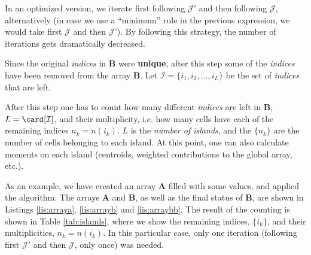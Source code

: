 \begin{enumerate}
  In an optimized version, we iterate first following $\mathcal{J}'$
  and then following $\mathcal{J}$, alternatively (in case we use a
  ``minimum'' rule in the previous expression, we would take first
  $\mathcal{J}$ and then $\mathcal{J}'$).  By following this strategy,
  the number of iterations gets dramatically decreased.
  
  Since the original \emph{indices} in $\mathbf{B}$ were
  \textbf{unique}, after this step some of the \emph{indices} have
  been removed from the array $\mathbf{B}$.  Let $\mathcal{I}=\{i_1,
  i_2, \ldots, i_L\}$ be the set of \emph{indices} that are left.
  
\end{enumerate}

After this step one has to count how many different \emph{indices} are
left in $\mathbf{B}$, $L = \card[\mathcal{I}]$, and their
multiplicity, i.e. how many cells have each of the remaining indices
$n_k = n(i_k)$.  $L$ is the \emph{number of islands}, and the $\{n_k\}$
are the number of cells belonging to each island.  At this point, one
can also calculate moments on each island (centroids, weighted
contributions to the global array, etc.).

As an example, we have created an array $\mathbf{A}$ filled with some
values, and applied the algorithm. The arrays $\mathbf{A}$ and
$\mathbf{B}$, as well as the final status of $\mathbf{B}$, are shown
in Listings \ref{lis:arraya}, \ref{lis:arrayb} and \ref{lis:arraybb}.
The result of the counting is shown in Table \ref{tab:islands}, where
we show the remaining indices, $\{i_k\}$, and their multiplicities, $n_k
= n(i_k)$. In this particular case, only one iteration (following
first $\mathcal{J}'$ and then $\mathcal{J}$, only once) was needed.

